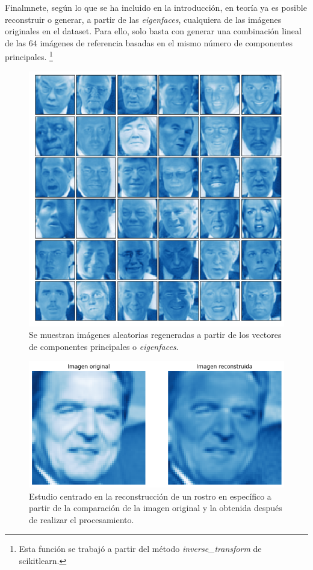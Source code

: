 \documentclass[conference]{IEEEtran}
\begin{document}
Finalmnete, según lo que se ha incluido en la introducción, en teoría ya es posible reconstruir o generar, a partir de las \textit{eigenfaces}, cualquiera de las imágenes originales en el dataset. Para ello, solo basta con generar una combinación lineal de las $64$ imágenes de referencia basadas en el mismo número de componentes principales. \footnote{Esta función se trabajó a partir del método \textit{inverse\_transform} de scikit\-learn.}

\begin{figure}[H]
    \centering
    \includegraphics[scale=0.25]{imgs/reconstructed.png}
    \caption{Se muestran imágenes aleatorias regeneradas a partir de los vectores de componentes principales o \textit{eigenfaces}.}
    \label{fig:svd_pc}
\end{figure}

\begin{figure}[H]
    \centering
    \includegraphics[scale=0.25]{imgs/reconstructed_individual.png}
    \caption{Estudio centrado en la reconstrucción de un rostro en específico a partir de la comparación de la imagen original y la obtenida después de realizar el procesamiento.}
    \label{fig:svd_pc}
\end{figure}
\end{document}
